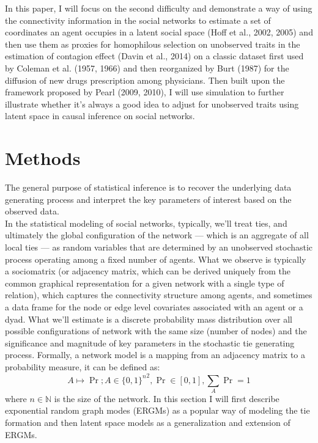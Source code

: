 \documentclass[11pt]{article}
\begin{document}
In this paper, I will focus on the second difficulty and demonstrate a way of using the connectivity information in the social networks to estimate a set of coordinates an agent occupies in a latent social space (Hoff et al., 2002, 2005) and then use them as proxies for homophilous selection on unobserved traits in the estimation of contagion effect (Davin et al., 2014) on a classic dataset first used by Coleman et al. (1957, 1966) and then reorganized by Burt (1987) for the diffusion of new drugs prescription among physicians. Then built upon the framework proposed by Pearl (2009, 2010), I will use simulation to further illustrate whether it's always a good idea to adjust for unobserved traits using latent space in causal inference on social networks.\\

\section{Methods}
The general purpose of statistical inference is to recover the underlying data generating process and interpret the key parameters of interest based on the observed data. \\

In the statistical modeling of social networks, typically, we'll treat ties, and ultimately the global configuration of the network --- which is an aggregate of all local ties --- as random variables that are determined by an unobserved stochastic process operating among a fixed number of agents. What we observe is typically a sociomatrix (or adjacency matrix, which can be derived uniquely from the common graphical representation for a given network with a single type of relation), which captures the connectivity structure among agents, and sometimes a data frame for the node or edge level covariates associated with an agent or a dyad. What we'll estimate is a discrete probability mass distribution over all possible configurations of network with the same size (number of nodes) and the significance and magnitude of key parameters in the stochastic tie generating process. Formally, a network model is a mapping from an adjacency matrix to a probability measure, it can be defined as:\\
$$A \mapsto \Pr; A\in \{{0,1\}^n}^ {2}, \Pr \in [0,1], \sum_{A} \Pr=1$$
where $n \in \mathbb{N}$ is the size of the network. In this section I will first describe exponential random graph modes (ERGMs) as a popular way of modeling the tie formation and then latent space models as a generalization and extension of ERGMs.\\
\end{document}

